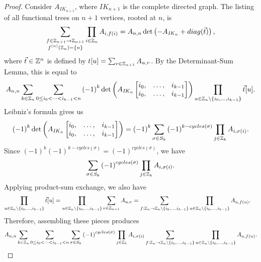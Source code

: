 \begin{proof}
    Consider $A_{\mathit{IK}_{n+1}}$, where $\mathit{IK}_{n+1}$ is the complete directed graph. The listing of all functional trees on $n+1$ vertices, rooted at $n$, is
    \begin{align*}
        \sum_{\substack{f \in \mathbb{Z}_{n+1}\to\mathbb{Z}_{n+1} \\
        f^{(n)}(\mathbb{Z}_n) = \{n\}}}\prod_{i\in\mathbb{Z}_n}A_{i,f(i)} = A_{n,n}\det\left(-A_{\mathit{IK}_n} + diag(\vec{t})\right),
    \end{align*}
    where $\vec{t} \in \mathbb{Z}^{n}$ is defined by $t[u] = \sum_{v \in \mathbb{Z}_{n+1}}A_{u,v}$. By the Determinant-Sum Lemma, this is equal to
    \begin{align*}
        A_{n,n}\sum_{k\in\mathbb{Z}_n}\sum_{0 \leq i_0 < \cdots < i_{k-1}<n}\left(-1\right)^{k}\det\left(A_{\mathit{IK}_n}\begin{bmatrix}
            i_0, &\ldots, &i_{k-1} \\
            i_0, &\ldots, &i_{k-1}
        \end{bmatrix}\right)\prod_{u\in\mathbb{Z}_n\setminus \{i_0, \ldots, i_{k-1}\}}\vec{t}[u].
    \end{align*}
    Leibniz's formula gives us
    \begin{align*}
        \left(-1\right)^{k}\det\left(A_{\mathit{IK}_n}\begin{bmatrix}
            i_0, &\ldots, &i_{k-1} \\
            i_0, &\ldots, &i_{k-1}
        \end{bmatrix}\right) = \left(-1\right)^{k}\sum_{\sigma\in S_k}\left(-1\right)^{k-cycles(\sigma)}\prod_{j\in\mathbb{Z}_k}A_{i,\sigma(i)}.
    \end{align*}
    Since $(-1)^{k}(-1)^{k-cycles(\sigma)} = (-1)^{cycles(\sigma)}$, we have
    \begin{align*}
        \sum_{\sigma\in S_k}\left(-1\right)^{cycles(\sigma)}\prod_{j\in\mathbb{Z}_k}A_{i,\sigma(i)}.
    \end{align*}
    Applying product-sum exchange, we also have
    \begin{align*}
        \prod_{u\in\mathbb{Z}_n\setminus \{i_0, \ldots, i_{k-1}\}}\vec{t}[u] &= \prod_{u\in\mathbb{Z}_n\setminus \{i_0, \ldots, i_{k-1}\}}\sum_{v \in \mathbb{Z}_{n+1}}A_{u,v} = \sum_{f:\mathbb{Z}_n\to\mathbb{Z}_{n}\setminus\{i_0, \ldots, i_{k-1}\}}\prod_{u\in\mathbb{Z}_n\setminus\{i_0, \ldots, i_{k-1}\}}A_{u,f(u)}.
    \end{align*}
    Therefore, assembling these pieces produces
    \begin{align*}
        A_{n,n}\sum_{k\in\Z_n}\sum_{0 \leq i_0 < \cdots < i_{k-1}<n}\sum_{\sigma\in S_k}\left(-1\right)^{cycles(\sigma)}\prod_{j\in\Z_k}A_{i,\sigma(i)}\sum_{f:\Z_n\to\Z_{n}\setminus\{i_0, \ldots, i_{k-1}\}}\prod_{u\in\Z_n\setminus\{i_0, \ldots, i_{k-1}\}}A_{u,f(u)}.

\end{align*}
\end{proof}
